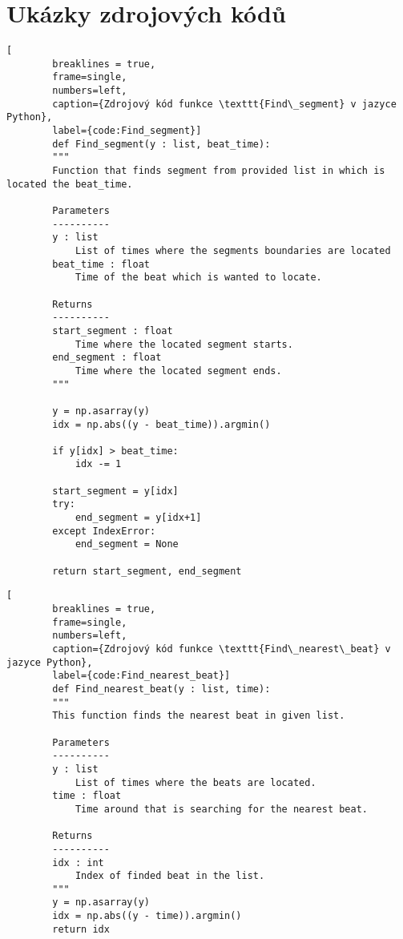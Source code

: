\chapter{Ukázky zdrojových kódů}

\begin{minipage}{\linewidth}
	\begin{lstlisting}[
		breaklines = true,
		frame=single,
		numbers=left,
		caption={Zdrojový kód funkce \texttt{Find\_segment} v jazyce Python},
		label={code:Find_segment}]
		def Find_segment(y : list, beat_time):
		"""
		Function that finds segment from provided list in which is located the beat_time.

		Parameters
		----------
		y : list
			List of times where the segments boundaries are located
		beat_time : float
			Time of the beat which is wanted to locate.

		Returns
		----------
		start_segment : float
			Time where the located segment starts.
		end_segment : float
			Time where the located segment ends.
		"""

		y = np.asarray(y)
		idx = np.abs((y - beat_time)).argmin()

		if y[idx] > beat_time:
			idx -= 1

		start_segment = y[idx]
		try:
			end_segment = y[idx+1]
		except IndexError:
			end_segment = None

		return start_segment, end_segment

	\end{lstlisting}
\end{minipage}

\begin{minipage}{\linewidth}
	\begin{lstlisting}[
		breaklines = true,
		frame=single,
		numbers=left,
		caption={Zdrojový kód funkce \texttt{Find\_nearest\_beat} v jazyce Python},
		label={code:Find_nearest_beat}]
		def Find_nearest_beat(y : list, time):
		"""
		This function finds the nearest beat in given list.
	
		Parameters
		----------
		y : list
			List of times where the beats are located.
		time : float
			Time around that is searching for the nearest beat.
	
		Returns 
		----------
		idx : int
			Index of finded beat in the list.
		"""
		y = np.asarray(y)
		idx = np.abs((y - time)).argmin() 
		return idx

	\end{lstlisting}
\end{minipage}

